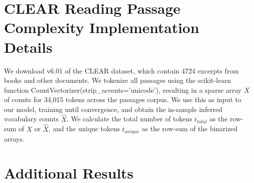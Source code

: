 \documentclass{article}
\theoremstyle{plain}
\theoremstyle{definition}
\theoremstyle{remark}
\begin{document}
\section{CLEAR Reading Passage Complexity Implementation Details}
\label{appendix:complexity}

We download v6.01 of the CLEAR dataset, which contain 4724 excerpts from books and other documents. We tokenize all passages using the scikit-learn function CountVectorizer(strip\_accents='unicode'), resulting in a sparse array $X$ of counts for 34,015 tokens across the passages corpus. We use this as input to our model, training until convergence, and obtain the in-sample inferred vocabulary counts $\hat{X}$. We calculate the total number of tokens $t_{total}$ as the row-sum of $X$ or $\hat{X}$, and the unique tokens $t_{unique}$ as the row-sum of the binarized arrays.

\newpage
\section{Additional Results}
\label{appendix:extra_results}
\end{document}
